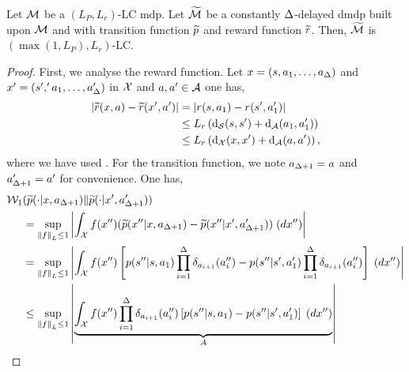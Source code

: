 \begin{prop}
\label{pp:lip_dmdp}
    Let $\mathcal{M}$ be a $(L_P,L_r)$-LC \gls{mdp}.
    Let $\widetilde{\mathcal{M}}$ be a constantly $\Delta$-delayed \gls{dmdp} built upon $\mathcal{M}$ and with transition function $\widetilde{p}$ and reward function $\widetilde{r}$.
    Then, $\widetilde{\mathcal{M}}$ is $(\max(1,L_P),L_r)$-LC.
\end{prop}
\begin{proof}
    First, we analyse the reward function.
    Let $x=(s,a_1,\dots,a_\Delta)$ and $x'=(s','a_1,\dots,a_\Delta')$ in $\mathcal{X}$ and $a,a'\in\mathcal{A}$ one has,
    \begin{align*}
        \lvert \widetilde{r}(x,a)-\widetilde{r}(x',a')\rvert 
        &= \lvert r(s,a_1)-r(s',a_1')\rvert 
        \\
        &\le
        L_r \left( \operatorname{\text{\normalfont d}}_{\mathcal{S}}(s,s') + \operatorname{\text{\normalfont d}}_{\mathcal{A}}(a_1,a_1')\right)
        \\
        &\le
        L_r \left( \operatorname{\text{\normalfont d}}_{\mathcal{X}}(x,x') + \operatorname{\text{\normalfont d}}_{\mathcal{A}}(a,a')\right),
    \end{align*}
    where we have used .
    For the transition function, we note $a_{\Delta+1}=a$ and $a_{\Delta+1}'=a'$ for convenience. 
    One has,
    \begin{align*}
        \wassersteindistance[1]&(\augmentedtransitionfunction(\cdot\vert x,a_{\delay+1})\Vert \augmentedtransitionfunction(\cdot\vert x',a_{\delay+1}'))
        \\
        &= \sup_{\left\Vert f\right\Vert_L\leq 1} \left\vert \int_{\augmentedstatespace} f(x'')(\augmentedtransitionfunction(x''\vert x,a_{\delay+1})-\augmentedtransitionfunction(x''\vert x',a_{\delay+1}'))\; (dx'') \right\vert
        \\
        &= \sup_{\left\Vert f\right\Vert_L\leq 1} \left\vert \int_{\augmentedstatespace} f(x'')\left[\transitionfunction(s''\vert s,a_{1})\prod_{i=1}^{\delay}\delta_{a_{i+1}}(a_i'')-\transitionfunction(s''\vert s',a_{1}')\prod_{i=1}^{\delay}\delta_{a_{i+1}}(a_i'')\right]\; (dx'') \right\vert
        \\
        &\le \sup_{\left\Vert f\right\Vert_L\leq 1} \left\vert \underbrace{\int_{\augmentedstatespace} f(x'')\prod_{i=1}^{\delay}\delta_{a_{i+1}}(a_i'')\left[\transitionfunction(s''\vert s,a_{1})-\transitionfunction(s''\vert s',a_{1}')\right]\; (dx'')}_{A} \right\vert

\end{align*}
\end{proof}

